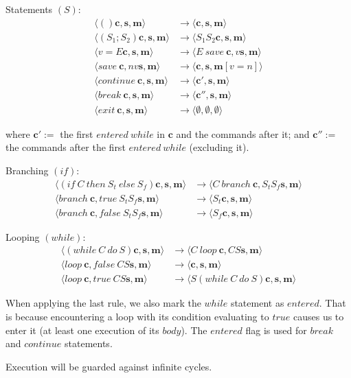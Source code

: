 \documentclass[11pt]{report}
\begin{document}
\vspace{2em}
\noindent Statements $(S)$:
\begin{align*}
\langle ()  \bm{c},  \bm{s},  \bm{m} \rangle    &\rightarrow   \langle  \bm{c},  \bm{s},  \bm{m} \rangle \\
\langle (S_1 ; S_2)  \bm{c},  \bm{s},  \bm{m} \rangle    &\rightarrow   \langle S_1 S_2  \bm{c},  \bm{s},  \bm{m} \rangle \\
\langle v=E  \bm{c},  \bm{s},  \bm{m} \rangle    &\rightarrow   \langle E\ save\  \bm{c}, v  \bm{s},  \bm{m} \rangle \\
\langle save \  \bm{c}, n v  \bm{s},  \bm{m} \rangle    &\rightarrow   \langle  \bm{c},  \bm{s},  \bm{m}[v=n] \rangle \\
\langle continue \  \bm{c}, \bm{s},  \bm{m} \rangle    &\rightarrow   \langle  \bm{c'},  \bm{s},  \bm{m} \rangle \\
\langle break \  \bm{c}, \bm{s},  \bm{m} \rangle    &\rightarrow   \langle  \bm{c''},  \bm{s},  \bm{m} \rangle \\
\langle exit \  \bm{c}, \bm{s},  \bm{m} \rangle    &\rightarrow   \langle  \emptyset,  \emptyset, \emptyset \rangle
\end{align*}

where $\bm{c'} :=$  the first $entered\ while$ in $\bm{c}$ and the commands after it; and $\bm{c''} :=$ the commands after the first $entered\ while$ (excluding it).


\newpage
\noindent Branching $(if)$:
\begin{align*}
\langle (if\ C\ then\ S_t\ else\ S_f)  \bm{c},  \bm{s},  \bm{m} \rangle    &\rightarrow   \langle C\ branch\  \bm{c}, S_t S_f  \bm{s},  \bm{m} \rangle \\
\langle branch\  \bm{c}, true\  S_t S_f  \bm{s},  \bm{m} \rangle    &\rightarrow   \langle S_t  \bm{c},  \bm{s},  \bm{m} \rangle \\
\langle branch\  \bm{c}, false\ S_t S_f  \bm{s},  \bm{m} \rangle    &\rightarrow   \langle S_f  \bm{c},  \bm{s},  \bm{m} \rangle
\end{align*}


\vspace{2em}
\noindent Looping $(while)$:
\begin{align*}
\langle (while\ C\ do\ S)  \bm{c},  \bm{s},  \bm{m} \rangle    &\rightarrow  \langle C\ loop\  \bm{c}, C S  \bm{s},  \bm{m} \rangle \\
\langle loop\  \bm{c}, false\ C S  \bm{s},  \bm{m} \rangle    &\rightarrow   \langle  \bm{c},  \bm{s},  \bm{m} \rangle \\
\langle loop\  \bm{c}, true\  C S  \bm{s},  \bm{m} \rangle    &\rightarrow   \langle S (while\ C\ do\ S)  \bm{c},  \bm{s},  \bm{m} \rangle 
\end{align*}

When applying the last rule, we also mark the $while$ statement as $entered$. That is because encountering a loop with its condition evaluating to $true$ causes us to enter it (at least one execution of its $body$). The $entered$ flag is used for $break$ and $continue$ statements.

Execution will be guarded against infinite cycles.
\end{document}

